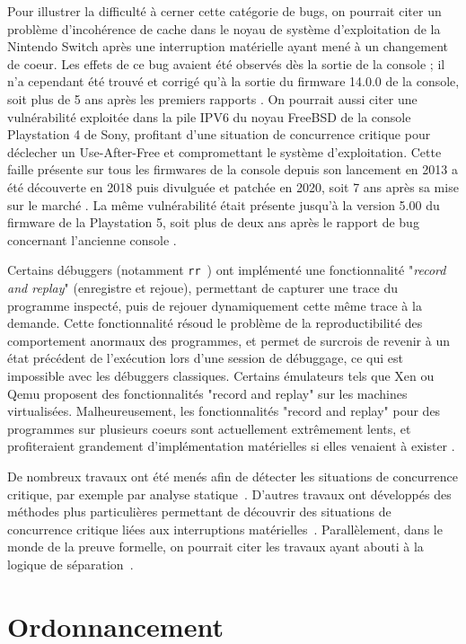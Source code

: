 Pour illustrer la difficulté à cerner cette catégorie de bugs, on pourrait citer un problème d'incohérence de cache dans le noyau de système d'exploitation de la Nintendo Switch après une interruption matérielle ayant mené à un changement de coeur. Les effets de ce bug avaient été observés dès la sortie de la console ; il n'a cependant été trouvé et corrigé qu'à la sortie du firmware 14.0.0 de la console, soit plus de 5 ans après les premiers rapports \cite{switchbug}.
On pourrait aussi citer une vulnérabilité exploitée dans la pile IPV6 du noyau FreeBSD de la console Playstation 4 de Sony, profitant d'une situation de concurrence critique pour déclecher un Use-After-Free et compromettant le système d'exploitation. Cette faille présente sur tous les firmwares de la console depuis son lancement en 2013 a été découverte en 2018 puis divulguée et patchée en 2020, soit 7 ans après sa mise sur le marché \cite{ps4bug}. La même vulnérabilité était présente jusqu'à la version 5.00 du firmware de la Playstation 5, soit plus de deux ans après le rapport de bug concernant l'ancienne console \cite{ps5bug}.

Certains débuggers (notamment \texttt{rr}~\cite{mozRR}) ont implémenté une fonctionnalité "\emph{record and replay}" (enregistre et rejoue), permettant de capturer une trace du programme inspecté, puis de rejouer dynamiquement cette même trace à la demande. Cette fonctionnalité résoud le problème de la reproductibilité des comportement anormaux des programmes, et permet de surcrois de revenir à un état précédent de l'exécution lors d'une session de débuggage, ce qui est impossible avec les débuggers classiques. Certains émulateurs tels que Xen ou Qemu proposent des fonctionnalités "record and replay" sur les machines virtualisées. Malheureusement, les fonctionnalités "record and replay" pour des programmes sur plusieurs coeurs sont actuellement extrêmement lents, et profiteraient grandement d'implémentation matérielles si elles venaient à exister \cite{mozRR}.

De nombreux travaux ont été menés afin de détecter les situations de concurrence critique, par exemple par analyse statique~\cite{racerX}. D'autres travaux ont développés des méthodes plus particulières permettant de découvrir des situations de concurrence critique liées aux interruptions matérielles~\cite{sdracer}. Parallèlement, dans le monde de la preuve formelle, on pourrait citer les travaux ayant abouti à la logique de séparation~\cite{separationlogic}.


		\section{Ordonnancement}

